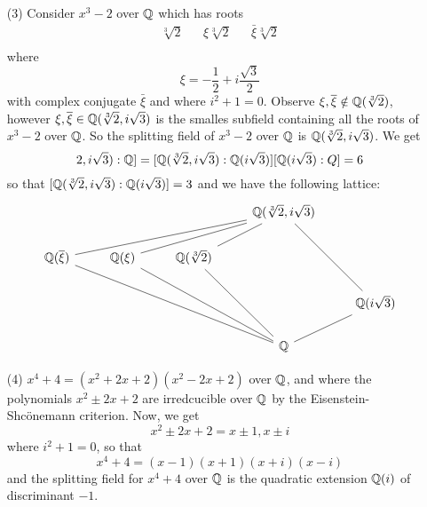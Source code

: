 \begin{example}
\begin{enumerate}
    \item[(3)] Consider $x^3-2$ over  $\mathbb{Q}$ which has roots
      \begin{align*}
        \sqrt[3]{2} &&  \xi\sqrt[3]{2}  &&  \bar{\xi}\sqrt[3]{2}  \\
      \end{align*}
      where
      \begin{equation*}
        \xi=-\frac{1}{2}+i\frac{\sqrt{3}}{2}
      \end{equation*}
      with complex conjugate $\bar{\xi}$ and where $i^2+1=0$.
      Observe $\xi, \overline{\xi} \notin \mathbb{Q}(\sqrt[3]{2})$, however $\xi,
      \overline{\xi} \in \mathbb{Q}(\sqrt[3]{2}, i\sqrt{3})$ is the smalles subfield
      containing all the roots of $x^3-2$ over $\mathbb{Q}$. So the splitting
      field of $x^3-2$ over  $\mathbb{Q}$ is $\mathbb{Q}(\sqrt[3]{2}, i\sqrt{3})$. We get
      \begin{equation*}
        [\Q(\sqrt[3]{2}, i\sqrt{3}):\Q]=
        [\Q(\sqrt[3]{2}, i\sqrt{3}):\Q(i\sqrt{3})][\Q(i\sqrt{3}):Q]=6
      \end{equation*}
      so that $[\mathbb{Q}(\sqrt[3]{2}, i\sqrt{3}):\mathbb{Q}(i\sqrt{3})]=3$ and we have
      the following lattice:
      \[\begin{tikzcd}
    &&& {\Q(\sqrt[3]{2}, i\sqrt{3})} \\
        {\Q(\bar{\xi})} & {\Q(\xi)} & {\Q(\sqrt[3]{2})} \\
                        &&&& {\Q(i\sqrt{3})} \\
                        &&& \Q
                        \arrow[no head, from=2-1, to=1-4]
                        \arrow[no head, from=2-2, to=1-4]
                        \arrow[no head, from=2-3, to=1-4]
                        \arrow[no head, from=3-5, to=1-4]
                        \arrow[no head, from=4-4, to=2-1]
                        \arrow[no head, from=4-4, to=2-2]
                        \arrow[no head, from=4-4, to=2-3]
                        \arrow[no head, from=4-4, to=3-5]
      \end{tikzcd}\]

    \item[(4)] $x^4+4=(x^2+2x+2)(x^2-2x+2)$ over $\mathbb{Q}$, and where the
      polynomials $x^2 \pm 2x+2$ are irredcucible over $\mathbb{Q}$ by the
      Eisenstein-Shc\"onemann criterion. Now, we get
      \begin{equation*}
        x^2 \pm 2x+2=x \pm 1, x \pm i
      \end{equation*}
      where $i^2+1=0$, so that
      \begin{equation*}
        x^4+4=(x-1)(x+1)(x+i)(x-i)
      \end{equation*}
      and the splitting field for $x^4+4$ over $\mathbb{Q}$ is the quadratic
      extension $\mathbb{Q}(i)$ of discriminant $-1$.
  \end{enumerate}
\end{example}

